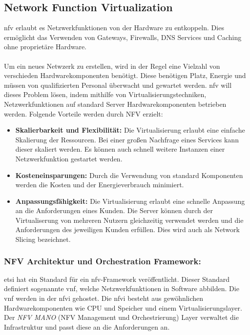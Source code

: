 \documentclass[runningheads]{llncs}
\numberwithin{figure}{section}
\begin{document}
\subsection{Network Function Virtualization}
\label{subsec:Network Function Virtualization}
\acrfull{nfv} erlaubt es Netzwerkfunktionen von der Hardware zu entkoppeln.
Dies ermöglicht das Verwenden von Gateways, Firewalls, DNS Services und Caching ohne proprietäre Hardware.
\\
\\
Um ein neues Netwzerk zu erstellen, wird in der Regel eine Vielzahl von verschieden Hardwarekomponenten benötigt. 
Diese benötigen Platz, Energie und müssen von qualifizierten Personal überwacht und gewartet werden. 
\acrlong{nfv} will dieses Problem lösen, indem mithilfe von Virtualisierungstechniken, Netzwerkfunktionen auf standard
Server Hardwarekomponenten betrieben werden. 
Folgende Vorteile werden durch NFV erzielt: \cite{nfv_wp} \cite{etsiNetworkFunctionsVirtualisation}
\begin{itemize}
  \item \textbf{Skalierbarkeit und Flexibilität:} Die Virtualisierung erlaubt eine einfache Skalierung der Ressourcen.
  Bei einer großen Nachfrage eines Services kann dieser skaliert werden. Es können auch schnell weitere Instanzen einer Netzwerkfunktion gestartet werden.
  \item \textbf{Kosteneinsparungen:} Durch die Verwendung von standard Komponenten werden die Kosten und der Energieverbrauch minimiert.
  \item \textbf{Anpassungsfähigkeit:} Die Virtualisierung erlaubt eine schnelle Anpassung an die Anforderungen eines Kunden. 
  Die Server können durch der Virtualiserung von mehreren Nutzern gleichzeitig verwendet werden und die Anforderungen des jeweiligen
  Kunden erfüllen. Dies wird auch als Network Slicing bezeichnet.
\end{itemize}


\subsubsection{NFV Architektur und Orchestration Framework:}
\acrshort{etsi} hat ein Standard für ein \acrshort{nfv}-Framework veröffentlicht.
Dieser Standard definiert sogenannte \acrfull{vnf}, welche Netzwerkfunktionen in Software abbilden.
Die \acrshort{vnf} werden in der \acrfull{nfvi} gehostet. Die \acrshort{nfvi} besteht aus gewöhnlichen
Hardwarekomponenten wie CPU und Speicher und einem Virtualisierungslayer. \\
Der \textit{NFV MANO} (NFV Management und Orchestrierung) Layer verwaltet die Infrastruktur und passt diese an die Anforderungen an.
\cite{etsiNetworkFunctionsVirtualisation}
\end{document}

